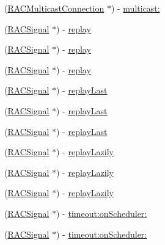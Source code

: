 \begin{DoxyCompactItemize}
\item 
(\mbox{\hyperlink{interface_r_a_c_multicast_connection}{R\+A\+C\+Multicast\+Connection}} $\ast$) -\/ \mbox{\hyperlink{interface_r_a_c_signal_a55b43f4fbef7e430a4587ce13eab18cb}{multicast\+:}}
\item 
(\mbox{\hyperlink{interface_r_a_c_signal}{R\+A\+C\+Signal}} $\ast$) -\/ \mbox{\hyperlink{interface_r_a_c_signal_a6d7d83297f6b837dd5efc18c38483a94}{replay}}
\item 
(\mbox{\hyperlink{interface_r_a_c_signal}{R\+A\+C\+Signal}} $\ast$) -\/ \mbox{\hyperlink{interface_r_a_c_signal_a6d7d83297f6b837dd5efc18c38483a94}{replay}}
\item 
(\mbox{\hyperlink{interface_r_a_c_signal}{R\+A\+C\+Signal}} $\ast$) -\/ \mbox{\hyperlink{interface_r_a_c_signal_a6d7d83297f6b837dd5efc18c38483a94}{replay}}
\item 
(\mbox{\hyperlink{interface_r_a_c_signal}{R\+A\+C\+Signal}} $\ast$) -\/ \mbox{\hyperlink{interface_r_a_c_signal_a1a660e0db48169a1ea54288b196515b1}{replay\+Last}}
\item 
(\mbox{\hyperlink{interface_r_a_c_signal}{R\+A\+C\+Signal}} $\ast$) -\/ \mbox{\hyperlink{interface_r_a_c_signal_a1a660e0db48169a1ea54288b196515b1}{replay\+Last}}
\item 
(\mbox{\hyperlink{interface_r_a_c_signal}{R\+A\+C\+Signal}} $\ast$) -\/ \mbox{\hyperlink{interface_r_a_c_signal_a1a660e0db48169a1ea54288b196515b1}{replay\+Last}}
\item 
(\mbox{\hyperlink{interface_r_a_c_signal}{R\+A\+C\+Signal}} $\ast$) -\/ \mbox{\hyperlink{interface_r_a_c_signal_aa1a3386d321ec82ceff16d98eaf74d33}{replay\+Lazily}}
\item 
(\mbox{\hyperlink{interface_r_a_c_signal}{R\+A\+C\+Signal}} $\ast$) -\/ \mbox{\hyperlink{interface_r_a_c_signal_aa1a3386d321ec82ceff16d98eaf74d33}{replay\+Lazily}}
\item 
(\mbox{\hyperlink{interface_r_a_c_signal}{R\+A\+C\+Signal}} $\ast$) -\/ \mbox{\hyperlink{interface_r_a_c_signal_aa1a3386d321ec82ceff16d98eaf74d33}{replay\+Lazily}}
\item 
(\mbox{\hyperlink{interface_r_a_c_signal}{R\+A\+C\+Signal}} $\ast$) -\/ \mbox{\hyperlink{interface_r_a_c_signal_a8c5f03f4cc8a132e91a985f3d5ccebc0}{timeout\+:on\+Scheduler\+:}}
\item 
(\mbox{\hyperlink{interface_r_a_c_signal}{R\+A\+C\+Signal}} $\ast$) -\/ \mbox{\hyperlink{interface_r_a_c_signal_a8c5f03f4cc8a132e91a985f3d5ccebc0}{timeout\+:on\+Scheduler\+:}}
\item 

\end{DoxyCompactItemize}
